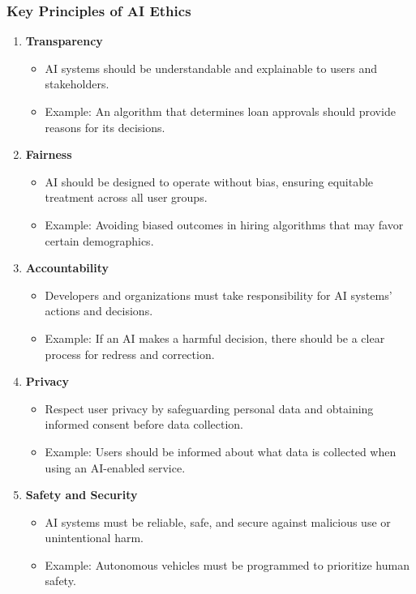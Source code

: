 \documentclass[aspectratio=169]{beamer}
\begin{document}
\begin{frame}[fragile]
    \frametitle{Key Principles of AI Ethics}
    \begin{enumerate}
        \item \textbf{Transparency}
            \begin{itemize}
                \item AI systems should be understandable and explainable to users and stakeholders. 
                \item Example: An algorithm that determines loan approvals should provide reasons for its decisions.
            \end{itemize}
        \item \textbf{Fairness}
            \begin{itemize}
                \item AI should be designed to operate without bias, ensuring equitable treatment across all user groups.
                \item Example: Avoiding biased outcomes in hiring algorithms that may favor certain demographics.
            \end{itemize}
        \item \textbf{Accountability}
            \begin{itemize}
                \item Developers and organizations must take responsibility for AI systems' actions and decisions.
                \item Example: If an AI makes a harmful decision, there should be a clear process for redress and correction.
            \end{itemize}
        \item \textbf{Privacy}
            \begin{itemize}
                \item Respect user privacy by safeguarding personal data and obtaining informed consent before data collection.
                \item Example: Users should be informed about what data is collected when using an AI-enabled service.
            \end{itemize}
        \item \textbf{Safety and Security}
            \begin{itemize}
                \item AI systems must be reliable, safe, and secure against malicious use or unintentional harm.
                \item Example: Autonomous vehicles must be programmed to prioritize human safety.
            \end{itemize}
    \end{enumerate}
\end{frame}
\end{document}
